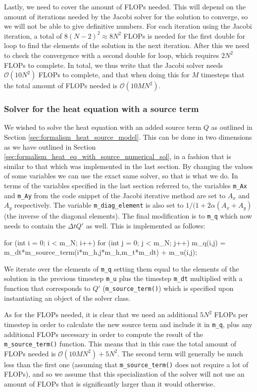 \documentclass[reprint,english,notitlepage]{revtex4-1}  %
\begin{document}
Lastly, we need to cover the amount of FLOPs needed. This will depend on the amount of iterations needed by the Jacobi solver for the solution to converge, so we will not be able to give definitive numbers. For each iteration using the Jacobi iteration, a total of $8(N-2)^2 \approx 8N^2$ FLOPs is needed for the first double for loop to find the elements of the solution in the next iteration. After this we need to check the convergence with a second double for loop, which requires $2N^2$ FLOPs to complete. In total, we thus write that the Jacobi solver needs $\mathcal{O}(10N^2)$ FLOPs to complete, and that when doing this for $M$ timesteps that the total amount of FLOPs needed is $\mathcal{O}(10MN^2)$. 

\subsubsection{Solver for the heat equation with a source term} \label{sec:method_heat_solver}

We wished to solve the heat equation with an added source term $Q$ as outlined in Section \ref{sec:formalism_heat_source_model}. This can be done in two dimensions as we have outlined in Section \ref{sec:formalism_heat_eq_with_source_numerical_sol}, in a fashion that is similar to that which was implemented in the last section. By changing the values of some variables we can use the exact same solver, so that is what we do. In terms of the variables specified in the last section referred to, the variables \verb+m_Ax+ and \verb+m_Ay+ from the code snippet of the Jacobi iterative method are set to $A_x$ and $A_y$ respectively. The variable \verb+m_diag_element+ is also set to $1/(1+ 2\alpha(A_x + A_y)$ (the inverse of the diagonal elements). The final modification is to \verb+m_q+ which now needs to contain the $\Delta t Q'$ as well. This is implemented as follows:

\begin{cpp}
for (int i = 0; i < m_N; i++){
  for (int j = 0; j < m_N; j++){
    m_q(i,j) = m_dt*m_source_term(i*m_h,j*m_h,m_t*m_dt) + m_u(i,j);
  }
}
\end{cpp}

We iterate over the elements of \verb+m_q+ setting them equal to the elements of the solution in the previous timestep \verb+m_u+ plus the timestep \verb+m_dt+ multiplied with a function that corresponds to $Q'$ (\verb+m_source_term()+) which is specified upon instantiating an object of the solver class.

As for the FLOPs needed, it is clear that we need an additional $5N^2$ FLOPs per timestep in order to calculate the new source term and include it in \verb+m_q+, plus any additional FLOPs necessary in order to compute the result of the \verb+m_source_term()+ function. This means that in this case the total amount of FLOPs needed is $\mathcal{O}(10MN^2) + 5N^2$. The second term will generally be much less than the first one (assuming that \verb+m_source_term()+ does not require a lot of FLOPs), and so we assume that this specialization of the solver will not use an amount of FLOPs that is significantly larger than it would otherwise.
\end{document}
